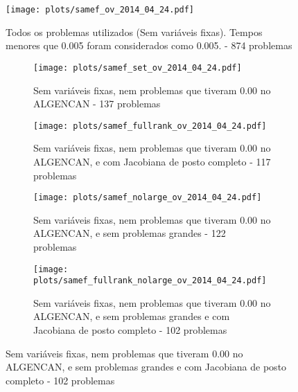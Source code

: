 \documentclass{article}
\begin{document}
\begin{figure}[H]
  \centering
  \texttt{[image: plots/samef\_ov\_2014\_04\_24.pdf]}
  \caption{Todos os problemas utilizados (Sem variáveis fixas). Tempos menores
    que 0.005 foram considerados como 0.005. - 874 problemas}
\end{figure}
\begin{figure}[H]
  \centering
  \begin{subfigure}{0.48\textwidth}
    \texttt{[image: plots/samef\_set\_ov\_2014\_04\_24.pdf]}
    \caption{Sem variáveis fixas, nem problemas
      que tiveram 0.00 no ALGENCAN - 137 problemas}
  \end{subfigure}
  \begin{subfigure}{0.48\textwidth}
    \texttt{[image: plots/samef\_fullrank\_ov\_2014\_04\_24.pdf]}
    \caption{Sem variáveis fixas, nem problemas
      que tiveram 0.00 no ALGENCAN, e com Jacobiana de posto completo - 117
      problemas}
  \end{subfigure}
  \begin{subfigure}{0.48\textwidth}
    \texttt{[image: plots/samef\_nolarge\_ov\_2014\_04\_24.pdf]}
    \caption{Sem variáveis fixas, nem problemas
      que tiveram 0.00 no ALGENCAN, e sem problemas grandes - 122 problemas}
  \end{subfigure}
  \begin{subfigure}{0.48\textwidth}
    \texttt{[image: plots/samef\_fullrank\_nolarge\_ov\_2014\_04\_24.pdf]}
    \caption{Sem variáveis fixas, nem problemas
      que tiveram 0.00 no ALGENCAN, e sem problemas grandes e com Jacobiana de
      posto completo - 102 problemas}
  \end{subfigure}
\end{figure}



\end{document}

